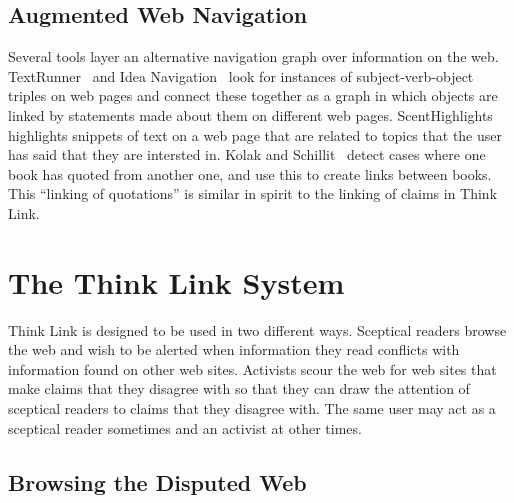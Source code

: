 \documentclass{chi2009}
\begin{document}
\subsection{Augmented Web Navigation}

Several tools layer an alternative navigation graph over information on the web. TextRunner~\cite{Etzioni2008} and Idea Navigation~\cite{Etzioni2008} look for instances of subject-verb-object triples on web pages and connect these together as a graph in which objects are linked by statements made about them on different web pages. ScentHighlights~\cite{Chi2005a} highlights snippets of text on a web page that are related to topics that the user has said that they are intersted in. Kolak and Schillit~\cite{Kolak2008} detect cases where one book has quoted from another one, and use this to create links between books. This ``linking of quotations'' is similar in spirit to the linking of claims in Think Link. 

% 

% 

\section{The Think Link System}

Think Link is designed to be used in two different ways. Sceptical readers browse the web and wish to be alerted when information they read conflicts with information found on other web sites. Activists scour the web for web sites that make claims that they disagree with so that they can draw the attention of sceptical readers to claims that they disagree with. The same user may act as a sceptical reader sometimes and an activist at other times.

\subsection{Browsing the Disputed Web}
\end{document}
